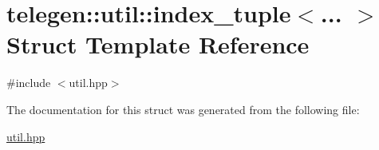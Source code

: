 \hypertarget{structtelegen_1_1util_1_1index__tuple}{}\section{telegen\+:\+:util\+:\+:index\+\_\+tuple$<$... $>$ Struct Template Reference}
\label{structtelegen_1_1util_1_1index__tuple}


{\ttfamily \#include $<$util.\+hpp$>$}



The documentation for this struct was generated from the following file\+:\begin{DoxyCompactItemize}
\item 
\hyperlink{util_8hpp}{util.\+hpp}\end{DoxyCompactItemize}
